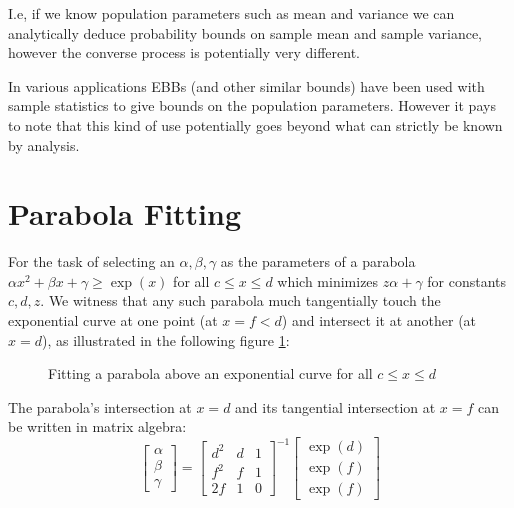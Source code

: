 \documentclass[aap,preprint]{imsart}
\begin{document}
I.e, if we know population parameters such as mean and variance we can analytically deduce probability bounds on sample mean and sample variance, however the converse process is potentially very different.

In various applications EBBs (and other similar bounds) have been used with sample statistics to give bounds on the population parameters. However it pays to note that this kind of use potentially goes beyond what can strictly be known by analysis.



\appendix

\section{Parabola Fitting}\label{appendix1}
For the task of selecting an $\alpha,\beta,\gamma$ as the parameters of a parabola $\alpha x^2+\beta x+\gamma\ge \exp(x)$ for all $c\le x\le d$ which minimizes $z\alpha+\gamma$ for constants $c,d,z$.
We witness that any such parabola much tangentially touch the exponential curve at one point (at $x=f<d$) and intersect it at another (at $x=d$), as illustrated in the following figure \ref{fig:graph1}:
\begin{figure}[h]
\caption{\footnotesize Fitting a parabola above an exponential curve for all $c\le x\le d$}
\label{fig:graph1}
\end{figure}
The parabola's intersection at $x=d$ and its tangential intersection at $x=f$ can be written in matrix algebra:
$$
\begin{bmatrix}
    \alpha \\
    \beta \\
	\gamma
\end{bmatrix}
=
\begin{bmatrix}
    d^2 & d & 1 \\
    f^2 & f & 1 \\
	2f  & 1 & 0
\end{bmatrix}^{-1}
\begin{bmatrix}
    \exp(d) \\
    \exp(f) \\
	\exp(f)
\end{bmatrix}$$
\end{document}
